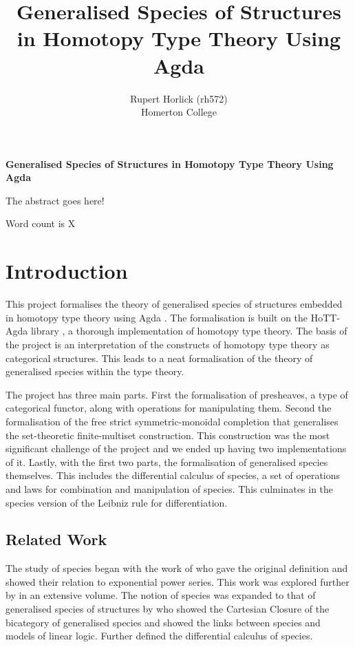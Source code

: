 \documentclass[12pt, parskip, DIV=14]{scrbook}
\title{Generalised Species of Structures in Homotopy Type Theory Using Agda}
\author{Rupert Horlick (rh572) \\
  \large Homerton College }
\date{}
\begin{document}
\frontmatter

\maketitle


\textbf{Generalised Species of Structures in Homotopy Type Theory Using Agda}

The abstract goes here!

\newpage

Word count is X

\tableofcontents

\mainmatter

\chapter{Introduction}

This project formalises the theory of generalised species of structures \citep{fiore2008cartesian} embedded in homotopy type theory \citep{hottbook} using Agda \citep{norell2007towards}. The formalisation is built on the HoTT-Agda library \citep{hottagda}, a thorough implementation of homotopy type theory. The basis of the project is an interpretation of the constructs of homotopy type theory as categorical structures. This leads to a neat formalisation of the theory of generalised species within the type theory.

The project has three main parts. First the formalisation of presheaves, a type of categorical functor, along with operations for manipulating them. Second the formalisation of the free strict symmetric-monoidal completion that generalises the set-theoretic finite-multiset construction. This construction was the most significant challenge of the project and we ended up having two implementations of it. Lastly, with the first two parts, the formalisation of generalised species themselves. This includes the differential calculus of species, a set of operations and laws for combination and manipulation of species. This culminates in the species version of the Leibniz rule for differentiation.

\section{Related Work}

The study of species began with the work of \citet{joyal1981une, joyal1986foncteurs} who gave the original definition and showed their relation to exponential power series. This work was explored further by \citet{bergeron1998combinatorial} in an extensive volume. The notion of species was expanded to that of generalised species of structures by \citet{fiore2008cartesian} who showed the Cartesian Closure of the bicategory of generalised species and showed the links between species and models of linear logic. Further \citet{fiore2005mathematical} defined the differential calculus of species.
\end{document}
